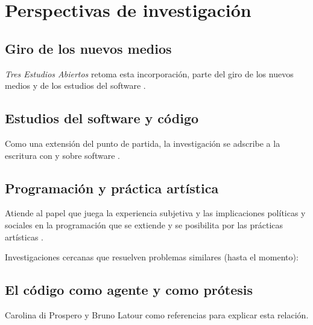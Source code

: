 
\chapter{Perspectivas de investigación}

\section{Giro de los nuevos medios}

\textit{Tres Estudios Abiertos} retoma esta incorporación, parte del giro de los nuevos medios y de los estudios del software \citep{manovichlanguage}.

\section{Estudios del software y código}

Como una extensión del punto de partida, la investigación se adscribe a la escritura con y sobre software \citep{aestheticProgramming}.

\section{Programación y práctica artística}

Atiende al papel que juega la experiencia subjetiva y las implicaciones políticas y sociales en la programación que se extiende y se posibilita por las prácticas artísticas \citep{speakingCode}. 

Investigaciones cercanas que resuelven problemas similares (hasta el momento):

\section{El código como agente y como prótesis}

Carolina di Prospero y Bruno Latour como referencias para explicar esta relación. 



